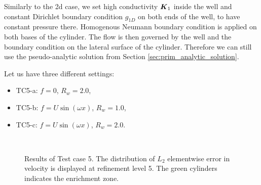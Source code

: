 Similarly to the 2d case, we set high conductivity $\mathbf{\boldsymbol{K}}_1$ inside the well and constant Dirichlet boundary condition $g_{1D}$ on both ends of the well,
to have constant pressure there.
Homogenous Neumann boundary condition is applied on both bases of the cylinder. The flow is then governed 
by the well and the boundary condition on the lateral surface of the cylinder.
Therefore we can still use the pseudo-analytic solution from Section \ref{sec:prim_analytic_solution}.

Let us have three different settings: 
\begin{itemize}
    \item TC5-a: $f=0$, $R_w=2.0$,
    \item TC5-b: $f=U\sin(\omega x)$, $R_w=1.0$,
    \item TC5-c: $f=U\sin(\omega x)$, $R_w=2.0$.
\end{itemize}
%
\begin{figure}[!htb]
    \centering
     \\
    \caption
    {Results of Test case 5. The distribution of $L_2$ elementwise error in velocity is displayed at refinement level 5.
    The green cylinders indicates the enrichment zone. }
    \label{fig:mh_tc4_error}
\end{figure}
%

